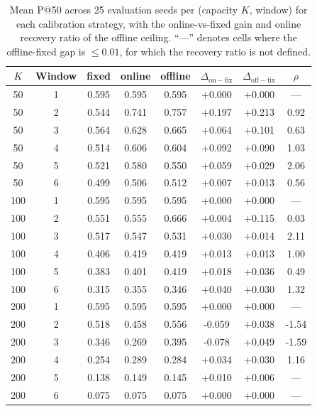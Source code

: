 \begin{table}[!t]
  \caption{Mean P@50 across 25 evaluation seeds per (capacity $K$, window) for each calibration strategy, with the online-vs-fixed gain and online recovery ratio of the offline ceiling. ``---'' denotes cells where the offline-fixed gap is $\leq 0.01$, for which the recovery ratio is not defined.}
  \label{tab:main}
  \centering
  \small
  \setlength{\tabcolsep}{6pt}
  \begin{tabular}{cc ccc cc c}
    \toprule
    $K$ & Window & fixed & online & offline & $\Delta_{\mathrm{on\!-\!fix}}$ & $\Delta_{\mathrm{off\!-\!fix}}$ & $\rho$ \\
    \midrule
    50 & 1 & 0.595 & 0.595 & 0.595 & +0.000 & +0.000 & --- \\
    50 & 2 & 0.544 & 0.741 & 0.757 & +0.197 & +0.213 & 0.92 \\
    50 & 3 & 0.564 & 0.628 & 0.665 & +0.064 & +0.101 & 0.63 \\
    50 & 4 & 0.514 & 0.606 & 0.604 & +0.092 & +0.090 & 1.03 \\
    50 & 5 & 0.521 & 0.580 & 0.550 & +0.059 & +0.029 & 2.06 \\
    50 & 6 & 0.499 & 0.506 & 0.512 & +0.007 & +0.013 & 0.56 \\
    \midrule
    100 & 1 & 0.595 & 0.595 & 0.595 & +0.000 & +0.000 & --- \\
    100 & 2 & 0.551 & 0.555 & 0.666 & +0.004 & +0.115 & 0.03 \\
    100 & 3 & 0.517 & 0.547 & 0.531 & +0.030 & +0.014 & 2.11 \\
    100 & 4 & 0.406 & 0.419 & 0.419 & +0.013 & +0.013 & 1.00 \\
    100 & 5 & 0.383 & 0.401 & 0.419 & +0.018 & +0.036 & 0.49 \\
    100 & 6 & 0.315 & 0.355 & 0.346 & +0.040 & +0.030 & 1.32 \\
    \midrule
    200 & 1 & 0.595 & 0.595 & 0.595 & +0.000 & +0.000 & --- \\
    200 & 2 & 0.518 & 0.458 & 0.556 & -0.059 & +0.038 & -1.54 \\
    200 & 3 & 0.346 & 0.269 & 0.395 & -0.078 & +0.049 & -1.59 \\
    200 & 4 & 0.254 & 0.289 & 0.284 & +0.034 & +0.030 & 1.16 \\
    200 & 5 & 0.138 & 0.149 & 0.145 & +0.010 & +0.006 & --- \\
    200 & 6 & 0.075 & 0.075 & 0.075 & +0.000 & +0.000 & --- \\
    \bottomrule
  \end{tabular}
\end{table}
